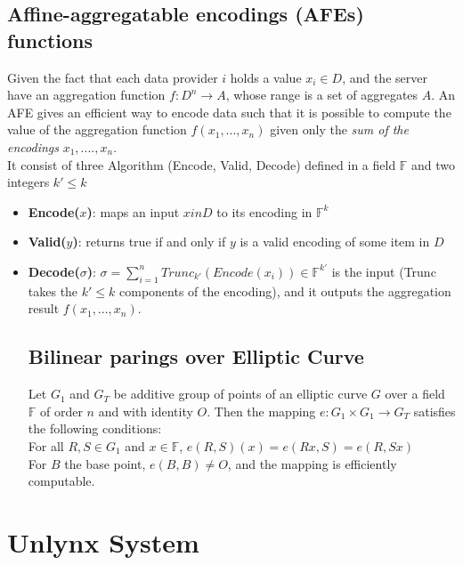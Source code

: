 \documentclass{article}
\begin{document}
\subsection*{Affine-aggregatable encodings (AFEs) functions}
Given the fact that each data provider $i$ holds a value $x_i \in D$, and the server have an aggregation function $f : D^n \rightarrow A$, whose range is a set of aggregates $A$.
An AFE gives an efficient way to encode data such that it is possible to compute the value of the aggregation function $f(x_1,...,x_n)$ given only the \textit{sum of the encodings} $x_1,....,x_n$.\\
It consist of three Algorithm (Encode, Valid, Decode) defined in a field $\mathbb{F}$ and two integers $k' \leq k$\\
\begin{itemize}
\item \textbf{Encode($x$)}: maps an input $x in D$ to its encoding in $\mathbb{F}^k$
\item \textbf{Valid($y$)}: returns true if and only if $y$ is a valid encoding of some item in $D$
\item \textbf{Decode($\sigma$)}: $\sigma = \sum_{i=1}^{n}{Trunc_{k'}(Encode(x_i))} \in \mathbb{F}^{k'}$ is the input (Trunc takes the $k' \leq k$ components of the encoding), and it outputs the aggregation result $f(x_1,...,x_n)$.
\subsection*{Bilinear parings over Elliptic Curve}
Let $G_1$ and $G_T$ be additive group of points of an elliptic curve $G$ over a field $\mathbb{F}$ of order $n$ and with identity $O$. Then the mapping $e: G_1 \times G_1 \rightarrow G_T$ satisfies the following conditions:\\
For all $R,S \in G_1$ and $x \in \mathbb{F}$, $e(R,S)(x) = e(Rx,S) = e(R,Sx)$\\
For $B$ the base point, $e(B,B) \neq O$, and the mapping is efficiently computable.
\end{itemize}
\section{Unlynx System}
\end{document}
